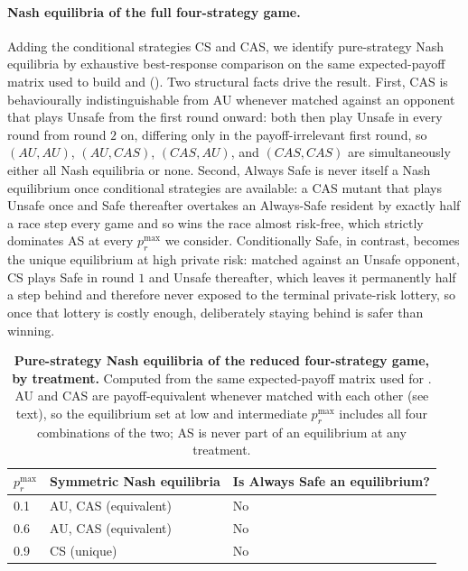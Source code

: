\documentclass[pdflatex,sn-mathphys-ay]{sn-jnl}
\theoremstyle{thmstyleone}
\theoremstyle{thmstyletwo}
\theoremstyle{thmstylethree}
\begin{document}
\paragraph{Nash equilibria of the full four-strategy game.} Adding the conditional strategies CS and CAS, we identify pure-strategy Nash equilibria by exhaustive best-response comparison on the same expected-payoff matrix used to build  and  (). Two structural facts drive the result. First, CAS is behaviourally indistinguishable from AU whenever matched against an opponent that plays Unsafe from the first round onward: both then play Unsafe in every round from round \(2\) on, differing only in the payoff-irrelevant first round, so \((AU,AU)\), \((AU,CAS)\), \((CAS,AU)\), and \((CAS,CAS)\) are simultaneously either all Nash equilibria or none. Second, Always Safe is never itself a Nash equilibrium once conditional strategies are available: a CAS mutant that plays Unsafe once and Safe thereafter overtakes an Always-Safe resident by exactly half a race step every game and so wins the race almost risk-free, which strictly dominates AS at every \(p_r^{\max}\) we consider. Conditionally Safe, in contrast, becomes the unique equilibrium at high private risk: matched against an Unsafe opponent, CS plays Safe in round \(1\) and Unsafe thereafter, which leaves it permanently half a step behind and therefore never exposed to the terminal private-risk lottery, so once that lottery is costly enough, deliberately staying behind is safer than winning.

\begin{table}[h]
\centering
\small
\caption{\textbf{Pure-strategy Nash equilibria of the reduced four-strategy game, by treatment.} Computed from the same expected-payoff matrix used for . AU and CAS are payoff-equivalent whenever matched with each other (see text), so the equilibrium set at low and intermediate \(p_r^{\max}\) includes all four combinations of the two; AS is never part of an equilibrium at any treatment.}
\label{tab:si:pd-nash}
\begin{tabular}{lll}
\toprule
\(p_r^{\max}\) & Symmetric Nash equilibria & Is Always Safe an equilibrium? \\
\midrule
0.1 & AU, CAS (equivalent) & No \\
0.6 & AU, CAS (equivalent) & No \\
0.9 & CS (unique) & No \\
\bottomrule
\end{tabular}
\end{table}
\end{document}
